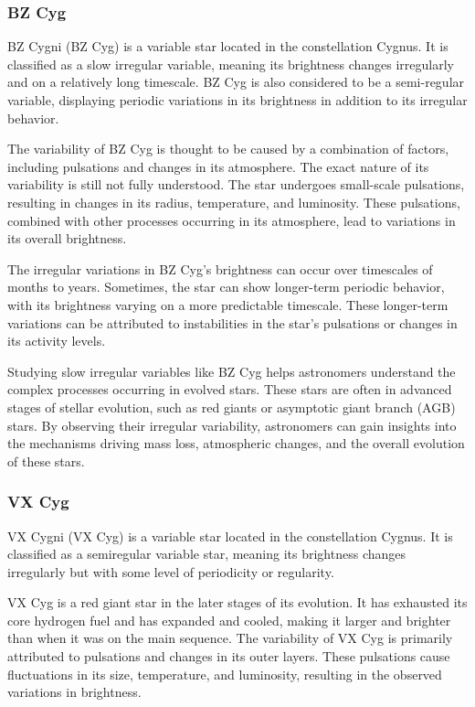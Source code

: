 \subsubsection*{ BZ Cyg }
BZ Cygni (BZ Cyg) is a variable star located in the constellation Cygnus. It is classified as a slow irregular variable, meaning its brightness changes irregularly and on a relatively long timescale. BZ Cyg is also considered to be a semi-regular variable, displaying periodic variations in its brightness in addition to its irregular behavior.

The variability of BZ Cyg is thought to be caused by a combination of factors, including pulsations and changes in its atmosphere. The exact nature of its variability is still not fully understood. The star undergoes small-scale pulsations, resulting in changes in its radius, temperature, and luminosity. These pulsations, combined with other processes occurring in its atmosphere, lead to variations in its overall brightness.

The irregular variations in BZ Cyg's brightness can occur over timescales of months to years. Sometimes, the star can show longer-term periodic behavior, with its brightness varying on a more predictable timescale. These longer-term variations can be attributed to instabilities in the star's pulsations or changes in its activity levels.

Studying slow irregular variables like BZ Cyg helps astronomers understand the complex processes occurring in evolved stars. These stars are often in advanced stages of stellar evolution, such as red giants or asymptotic giant branch (AGB) stars. By observing their irregular variability, astronomers can gain insights into the mechanisms driving mass loss, atmospheric changes, and the overall evolution of these stars.

\subsubsection*{ VX Cyg }
VX Cygni (VX Cyg) is a variable star located in the constellation Cygnus. It is classified as a semiregular variable star, meaning its brightness changes irregularly but with some level of periodicity or regularity.

VX Cyg is a red giant star in the later stages of its evolution. It has exhausted its core hydrogen fuel and has expanded and cooled, making it larger and brighter than when it was on the main sequence. The variability of VX Cyg is primarily attributed to pulsations and changes in its outer layers. These pulsations cause fluctuations in its size, temperature, and luminosity, resulting in the observed variations in brightness.

